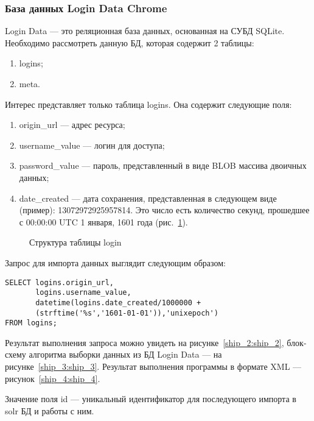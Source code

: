 \subsubsection{База данных Login Data Chrome}

Login Data --- это реляционная база данных, основанная на СУБД SQLite.
Необходимо рассмотреть данную БД, которая содержит 2 таблицы:

\begin{enumerate}
  \item logins;
  \item meta.
\end{enumerate}

Интерес представляет только таблица logins. Она содержит следующие поля:

\begin{enumerate}
  \item origin\_url --- адрес ресурса;
  \item username\_value --- логин для доступа;
  \item password\_value --- пароль, представленный в виде BLOB массива двоичных данных;
  \item date\_created --- дата сохранения, представленная в следующем виде (пример): 13072972925957814. Это число есть количество секунд, прошедшее с 00:00:00 UTC 1 января, 1601 года (рис.~\ref{ship_1:ship_1}).
\end{enumerate}


\begin{figure}[h!]
\caption{Структура таблицы login}
\label{ship_1:ship_1}
\end{figure} 


Запрос для импорта данных выглядит следующим образом:


\begin{verbatim}
SELECT logins.origin_url,
       logins.username_value,
       datetime(logins.date_created/1000000 + 
       (strftime('%s','1601-01-01')),'unixepoch')
FROM logins;
\end{verbatim}

Результат выполнения запроса можно увидеть на рисунке~\ref{ship_2:ship_2}, блок-схему алгоритма выборки данных из БД Login Data --- на рисунке~\ref{ship_3:ship_3}. Результат выполнения программы в формате XML --- рисунок~\ref{ship_4:ship_4}.


Значение поля id --- уникальный идентификатор для последующего импорта в solr БД и работы с ним.


